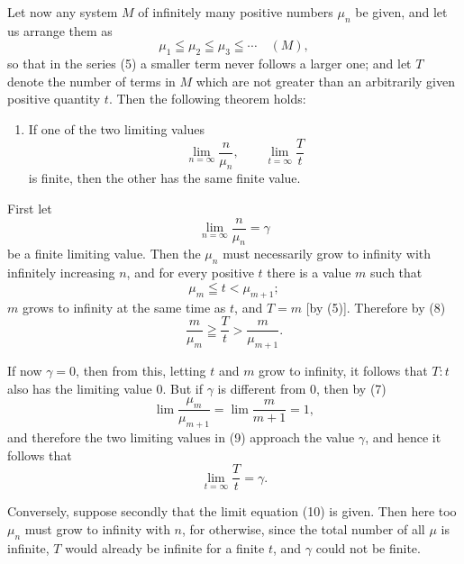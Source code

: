 \documentclass[11pt]{article}
\begin{document}
Let now any system $M$ of infinitely many positive numbers $\mu_n$ be given, and let us arrange them as
\begin{equation}
\mu_1\leqq\mu_2\leqq\mu_3\leqq\cdots\quad (M),
\tag{5}
\end{equation}
so that in the series (5) a smaller term never follows a larger one; and let $T$ denote the number of terms in $M$ which are not greater than an arbitrarily given positive quantity $t$. Then the following theorem holds:

\begin{enumerate}[label=\textbf{\arabic*.},leftmargin=2.2em,start=4]
\item If one of the two limiting values
\begin{equation}
\lim_{n=\infty}\frac{n}{\mu_n},\qquad \lim_{t=\infty}\frac{T}{t}
\tag{6}
\end{equation}
is finite, then the other has the same finite value.
\end{enumerate}

First let
\begin{equation}
\lim_{n=\infty}\frac{n}{\mu_n}=\gamma
\tag{7}
\end{equation}
be a finite limiting value. Then the $\mu_n$ must necessarily grow to infinity with infinitely increasing $n$, and for every positive $t$ there is a value $m$ such that
\begin{equation}
\mu_m\leqq t<\mu_{m+1};
\tag{8}
\end{equation}
$m$ grows to infinity at the same time as $t$, and $T=m$ [by (5)]. Therefore by (8)
\begin{equation}
\frac{m}{\mu_m}\geqq\frac{T}{t}>\frac{m}{\mu_{m+1}} .
\tag{9}
\end{equation}

If now $\gamma=0$, then from this, letting $t$ and $m$ grow to infinity, it follows that $T:t$ also has the limiting value $0$. But if $\gamma$ is different from $0$, then by (7)
\[
\lim\frac{\mu_m}{\mu_{m+1}}=\lim\frac{m}{m+1}=1,
\]
and therefore the two limiting values in (9) approach the value $\gamma$, and hence it follows that
\begin{equation}
\lim_{t=\infty}\frac{T}{t}=\gamma.
\tag{10}
\end{equation}

Conversely, suppose secondly that the limit equation (10) is given. Then here too $\mu_n$ must grow to infinity with $n$, for otherwise, since the total number of all $\mu$ is infinite, $T$ would already be infinite for a finite $t$, and $\gamma$ could not be finite.
\end{document}
